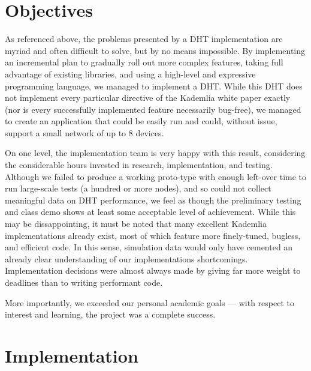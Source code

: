 \documentclass[12pt]{report}
\begin{document}
    \section{Objectives\label{objectives}}
    As referenced above, the problems presented by a DHT implementation are
    myriad and often difficult to solve, but by no means impossible.  By implementing
    an incremental plan to gradually roll out more complex features, taking
    full advantage of existing libraries, and using a high-level and expressive
    programming language, we managed to implement a DHT.  While this DHT does
    not implement every particular directive of the Kademlia white paper
    exactly (nor is every successfully implemented feature necessarily
    bug-free), we managed to create an application that could be easily run and
    could, without issue, support a small network of up to 8 devices.

    On one level, the implementation team is very happy with this result,
    considering the considerable hours invested in research, implementation,
    and testing.  Although we failed to produce a working proto-type with
    enough left-over time to run large-scale tests (a hundred or more nodes), and
    so could not collect meaningful data on DHT performance, we feel as though
    the preliminary testing and class demo shows at least some acceptable level
    of achievement.  While this may be dissappointing, it must be noted that
    many excellent Kademlia implementations already exist, most of which
    feature more finely-tuned, bugless, and efficient code.  In this sense,
    simulation data would only have cemented an already clear understanding of
    our implementations shortcomings.  Implementation decisions were almost
    always made by giving far more weight to deadlines than to writing
    performant code.
    
    More importantly, we exceeded our personal academic goals
    --- with respect to interest and learning, the project was a complete
    success.  
    
    \section{Implementation}
\end{document}
